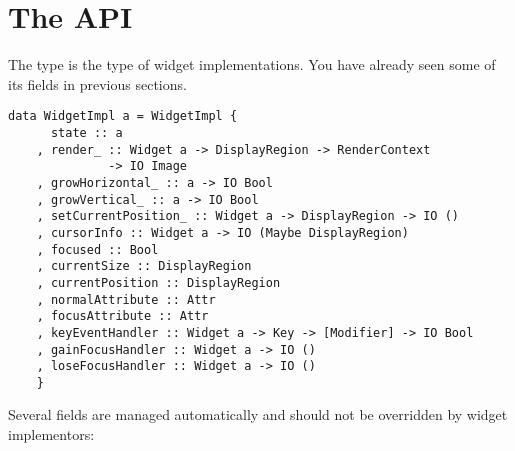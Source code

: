 \section{The  API}

The  type is the type of widget implementations.  You
have already seen some of its fields in previous sections.

\begin{verbatim}
data WidgetImpl a = WidgetImpl {
      state :: a
    , render_ :: Widget a -> DisplayRegion -> RenderContext
              -> IO Image
    , growHorizontal_ :: a -> IO Bool
    , growVertical_ :: a -> IO Bool
    , setCurrentPosition_ :: Widget a -> DisplayRegion -> IO ()
    , cursorInfo :: Widget a -> IO (Maybe DisplayRegion)
    , focused :: Bool
    , currentSize :: DisplayRegion
    , currentPosition :: DisplayRegion
    , normalAttribute :: Attr
    , focusAttribute :: Attr
    , keyEventHandler :: Widget a -> Key -> [Modifier] -> IO Bool
    , gainFocusHandler :: Widget a -> IO ()
    , loseFocusHandler :: Widget a -> IO ()
    }
\end{verbatim}

Several fields are managed automatically and should not be overridden
by widget implementors:

